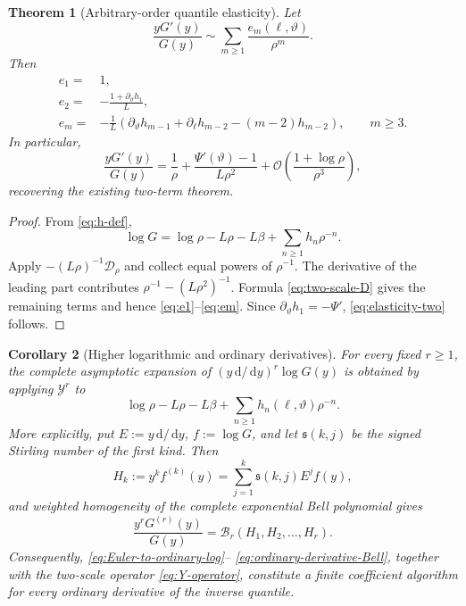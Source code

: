 \documentclass[11pt,oneside]{article}
\numberwithin{equation}{section}
\newtheorem{theorem}{Theorem}[section]
\newtheorem{corollary}[theorem]{Corollary}
\theoremstyle{definition}
\theoremstyle{remark}
\newcommand{\dd}{\,\mathrm d}
\newcommand{\bigO}{\mathcal O}
\newcommand{\phase}{\vartheta}
\newcommand{\Bell}{\mathcal B}
\begin{document}
\begin{theorem}[Arbitrary-order quantile elasticity]
\label{thm:elasticity-all-orders}
Let
\begin{equation}
 \frac{yG'(y)}{G(y)}\sim\sum_{m\ge1}\frac{e_m(\ell,\phase)}{\rho^m}.
 \label{eq:e-series}
\end{equation}
Then
\begin{align}
 e_1={}&1,
 \label{eq:e1}\\
 e_2={}&-\frac{1+\partial_\phase h_1}{L},
 \label{eq:e2}\\
 e_m={}&-\frac1L\left(
 \partial_\phase h_{m-1}
 +\partial_\ell h_{m-2}-(m-2)h_{m-2}
 \right),\qquad m\ge3.
 \label{eq:em}
\end{align}
In particular,
\begin{equation}
 \frac{yG'(y)}{G(y)}
 =\frac1\rho+\frac{\Psi'(\phase)-1}{L\rho^2}
 +\bigO\!\left(\frac{1+\log\rho}{\rho^3}\right),
 \label{eq:elasticity-two}
\end{equation}
recovering the existing two-term theorem.
\end{theorem}

\begin{proof}
From \eqref{eq:h-def},
\[
 \log G=\log\rho-L\rho-L\beta+\sum_{n\ge1}h_n\rho^{-n}.
\]
Apply $-(L\rho)^{-1}\mathscr D_\rho$ and collect equal powers of $\rho^{-1}$.
The derivative of the leading part contributes
$\rho^{-1}-(L\rho^2)^{-1}$.  Formula \eqref{eq:two-scale-D} gives the remaining
terms and hence \eqref{eq:e1}--\eqref{eq:em}.  Since
$\partial_\phase h_1=-\Psi'$, \eqref{eq:elasticity-two} follows.
\end{proof}

\begin{corollary}[Higher logarithmic and ordinary derivatives]
\label{cor:higher-log-derivatives}
For every fixed $r\ge1$, the complete asymptotic expansion of
\((y\dd/\dd y)^r\log G(y)\) is obtained by applying $\mathscr Y^r$ to
\[
 \log\rho-L\rho-L\beta+\sum_{n\ge1}h_n(\ell,\phase)\rho^{-n}.
\]
More explicitly, put $E:=y\dd/\dd y$, $f:=\log G$, and let
$\mathfrak s(k,j)$ be the signed Stirling number of the first kind.  Then
\begin{equation}
 H_k:=y^k f^{(k)}(y)
 =\sum_{j=1}^k\mathfrak s(k,j)E^jf(y),
 \label{eq:Euler-to-ordinary-log}
\end{equation}
and weighted homogeneity of the complete exponential Bell polynomial gives
\begin{equation}
 \boxed{
 \frac{y^rG^{(r)}(y)}{G(y)}
 =\Bell_r(H_1,H_2,\ldots,H_r).}
 \label{eq:ordinary-derivative-Bell}
\end{equation}
Consequently, \eqref{eq:Euler-to-ordinary-log}--
\eqref{eq:ordinary-derivative-Bell}, together with the two-scale operator
\eqref{eq:Y-operator}, constitute a finite coefficient algorithm for every
ordinary derivative of the inverse quantile.
\end{corollary}
\end{document}

